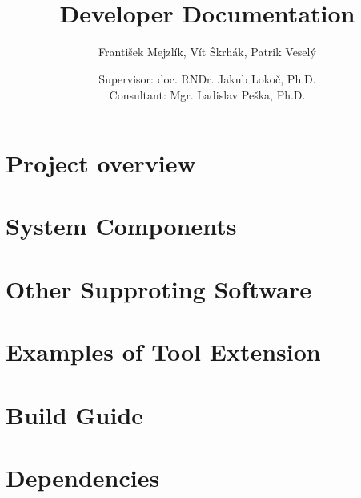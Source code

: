 \documentclass[10pt,a4paper]{report}
\title{\textcool{\bf SOMHunter Video Search Tool} \\ Developer Documentation}
\author{František Mejzlík, Vít Škrhák, Patrik Veselý}
\date{Supervisor: doc. RNDr. Jakub Lokoč, Ph.D. \\ \vspace{5mm} Consultant: Mgr. Ladislav Peška, Ph.D.}
\begin{document}
\maketitle

\tableofcontents




\part{Project overview}



\part{System Components}







\part{Other Supproting Software}



\part{Examples of Tool Extension}




\part{Build Guide}


\part{Dependencies}


 


\printindex
\begin{appendices}

\end{appendices}
\end{document}
